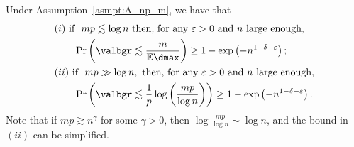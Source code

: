 \begin{theorem}
    \label{thm:alg_solution_ub}
        Under Assumption~\ref{asmpt:A_np_m}, we have that
        \begin{equation}
            \begin{aligned}
                &(i) \text{ if } \  mp \lesssim \log n \  \text{then, for any } \varepsilon >0\text{ and } n \text{ large enough},\\ 
                &\qquad \Pr\left(\valbgr \lesssim \frac{m}{\mathbb{E}\dmax}\right) \geq 1 - \exp\left(-n^{1 - \delta - \varepsilon}\right); \\
                &(ii) \text{ if } \ mp \gg \log n, \text{ then, for any } \varepsilon > 0 \text{ and } n \text{ large enough}, \\
                &\qquad\Pr\left(\valbgr \lesssim \frac{1}{p} \log\left(\frac{mp}{\log n}\right)\right) \geq 1 - \exp\left(-n^{1 - \delta - \varepsilon}\right). \\
             \end{aligned}
        \end{equation}
        Note that if \(mp \gtrsim n^{\gamma}\) for some \(\gamma > 0\), then \(\log \frac{mp}{\log n} \sim \log n\), and the bound in \((ii)\) can be simplified.
\end{theorem}

